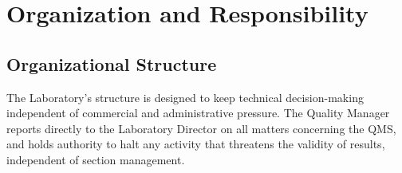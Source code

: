 
\section{Organization and Responsibility}

\subsection{Organizational Structure}

The Laboratory's structure is designed to keep technical decision-making independent of
commercial and administrative pressure. The Quality Manager reports directly to the
Laboratory Director on all matters concerning the QMS, and holds authority to halt any
activity that threatens the validity of results, independent of section management.

